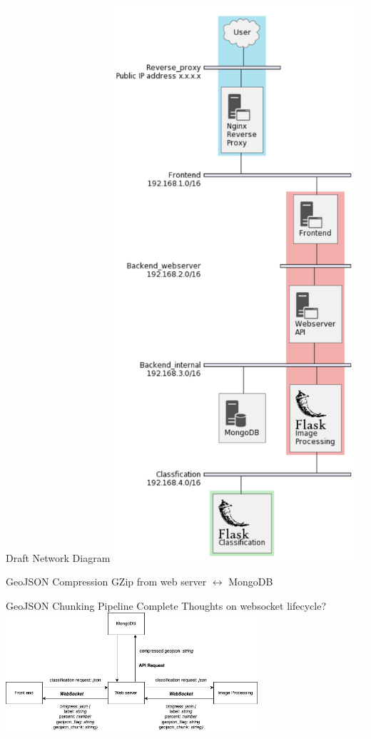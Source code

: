 \begin{frame}{Draft Network Diagram}
    \centering
    \includegraphics[height=0.7\textheight,width=0.7\textwidth,keepaspectratio]{images/network.png}
\end{frame}

\begin{frame}{GeoJSON Compression}
    GZip from web server $\leftrightarrow$ MongoDB
\end{frame}

\begin{frame}{GeoJSON Chunking Pipeline Complete}
    Thoughts on websocket lifecycle?
    \centering
    \includegraphics[height=0.7\textheight,width=0.7\textwidth,keepaspectratio]{images/websocket.png}
\end{frame}